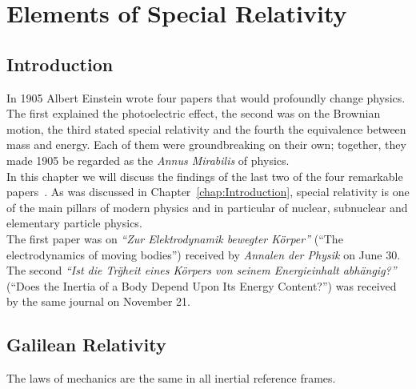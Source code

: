 %
%
%
\chapter{Elements of Special Relativity}
\label{Relativity} %

\section{Introduction}

In 1905 Albert Einstein wrote four papers that would profoundly change physics. The first explained the photoelectric effect, the second was on the Brownian motion, the third stated special relativity and the fourth the equivalence between mass and energy. Each of them were groundbreaking on their own; together, they 
made 1905 be regarded as the {\it Annus Mirabilis} of physics. \\

In this chapter we will discuss the findings of the last two of the four remarkable papers~\cite{Relativity-1,Relativity-2}. As was discussed in Chapter~\ref{chap:Introduction}, special relativity is one of the main pillars of modern physics and in particular of nuclear, subnuclear and elementary particle physics.\\

The first paper was on {\it ``Zur Elektrodynamik bewegter K\"orper''} (``The electrodynamics of moving bodies'') received by {\it Annalen der Physik} on June 30. The second {\it ``Ist die Tr\"gheit eines K\"orpers von seinem Energieinhalt abh\"angig?''} (``Does the Inertia of a Body Depend Upon Its Energy Content?'') was received by the same journal on November 21. \\

\section{Galilean Relativity}

\begin{postulate}
  \label{postulate:galilean-relativity}
  The laws of mechanics are the same in all inertial reference frames.\\
\end{postulate}

